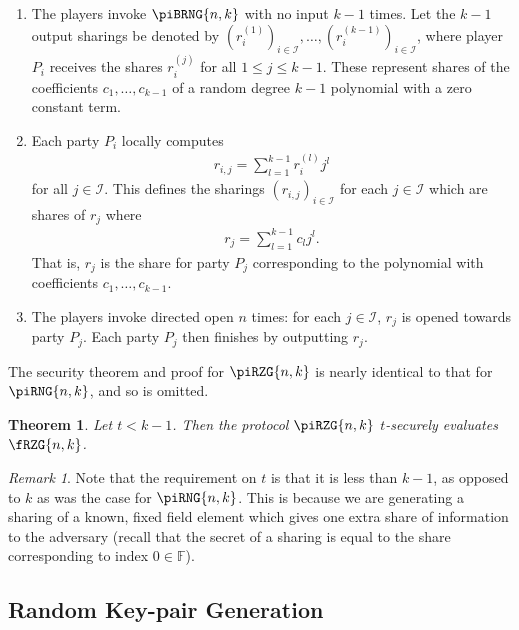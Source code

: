 \documentclass{article}
\newtheorem{theorem}{Theorem}
\theoremstyle{remark}
\newtheorem{remark}{Remark}
\newcommand{\F}{\mathbb{F}}
\begin{document}
\begin{enumerate}
	\item The players invoke $\piBRNG{n,k}$ with no input $k-1$ times. Let the
		$k-1$ output sharings be denoted by ${\left(r_i^{(1)}\right)}_{i \in
		\mathcal{I}}, \ldots, {\left(r_i^{(k-1)}\right)}_{i \in \mathcal{I}}$,
		where player $P_i$ receives the shares $r_i^{(j)}$ for all $1 \le j \le
		k-1$. These represent shares of the coefficients $c_1, \ldots, c_{k-1}$
		of a random degree $k-1$ polynomial with a zero constant term.

	\item Each party $P_i$ locally computes
		\begin{align*}
			r_{i,j} = \sum_{l=1}^{k-1} r_i^{(l)} j^l
		\end{align*}
		for all $j \in \mathcal{I}$. This defines the sharings ${(r_{i,j})}_{i
		\in \mathcal{I}}$ for each $j \in \mathcal{I}$ which are shares of
		$r_j$ where
		\begin{align*}
			r_j = \sum_{l=1}^{k-1} c_l j^l.
		\end{align*}
		That is, $r_j$ is the share for party $P_j$ corresponding to the
		polynomial with coefficients $c_1, \ldots, c_{k-1}$.

	\item The players invoke directed open $n$ times: for each $j \in
		\mathcal{I}$, $r_j$ is opened towards party $P_j$. Each party $P_j$
		then finishes by outputting $r_j$.
\end{enumerate}

The security theorem and proof for $\piRZG{n,k}$ is nearly identical to that
for $\piRNG{n,k}$, and so is omitted.

\begin{theorem}
	Let $t < k - 1$. Then the protocol $\piRZG{n,k}$ $t$-securely evaluates
	$\fRZG{n,k}$.
\end{theorem}

\begin{remark}
	Note that the requirement on $t$ is that it is less than $k - 1$, as
	opposed to $k$ as was the case for $\piRNG{n,k}$. This is because we are
	generating a sharing of a known, fixed field element which gives one extra
	share of information to the adversary (recall that the secret of a sharing
	is equal to the share corresponding to index $0 \in \F$).
\end{remark}

\subsection{Random Key-pair Generation}\label{sec:rkpg}
\end{document}
